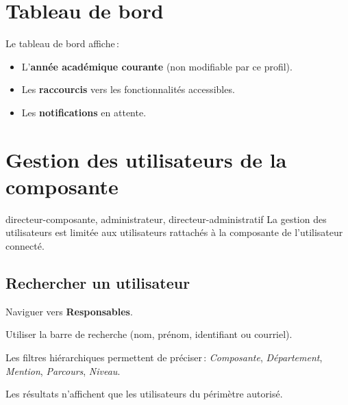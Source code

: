 \section{Tableau de bord}


Le tableau de bord affiche\,:
\begin{itemize}
  \item L'\textbf{ann\'ee acad\'emique courante} (non modifiable par ce profil).
  \item Les \textbf{raccourcis} vers les fonctionnalit\'es accessibles.
  \item Les \textbf{notifications} en attente.
\end{itemize}

\section{Gestion des utilisateurs de la composante}

\begin{rolebox}{directeur-composante, administrateur, directeur-administratif}
  La gestion des utilisateurs est limit\'ee aux utilisateurs rattach\'es \`a la composante de l'utilisateur connect\'e.
\end{rolebox}

\subsection{Rechercher un utilisateur}

\begin{steps}
  \item Naviguer vers \textbf{Responsables}.
  \item Utiliser la barre de recherche (nom, pr\'enom, identifiant ou courriel).
  \item Les filtres hi\'erarchiques permettent de pr\'eciser\,: \textit{Composante}, \textit{D\'epartement}, \textit{Mention}, \textit{Parcours}, \textit{Niveau}.
  \item Les r\'esultats n'affichent que les utilisateurs du p\'erim\`etre autoris\'e.
\end{steps}


